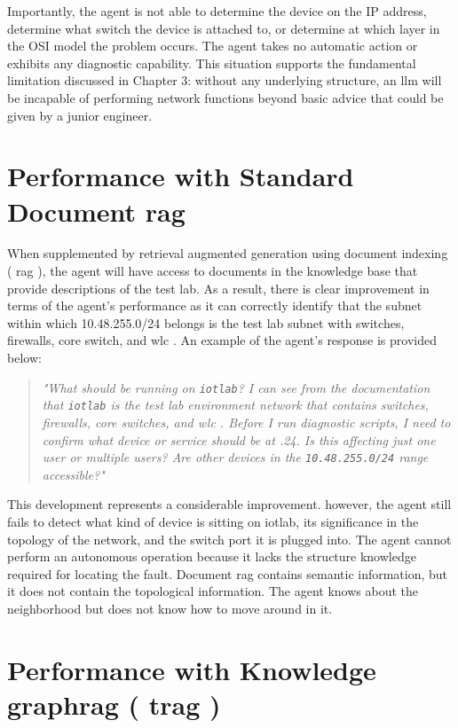 \documentclass[11pt,a4paper]{report}
\begin{document}
Importantly, the agent is not able to determine the device on the IP address, determine what switch the device is attached to, or determine at which layer in the OSI model the problem occurs. The agent takes no automatic action or exhibits any diagnostic capability. This situation supports the fundamental limitation discussed in Chapter 3: without any underlying structure, an \gls{llm}  will be incapable of performing network functions beyond basic advice that could be given by a junior engineer.

\section{Performance with Standard Document  \gls{rag} }
When supplemented by retrieval augmented generation using document indexing ( \gls{rag} ), the agent will have access to documents in the knowledge base that provide descriptions of the test lab. As a result, there is clear improvement in terms of the agent’s performance as it can correctly identify that the subnet within which 10.48.255.0/24 belongs is the test lab subnet with switches, firewalls, core switch, and  \gls{wlc} . An example of the agent’s response is provided below:

\begin{quote}
\textit{"What should be running on \texttt{iotlab}? I can see from the documentation that \texttt{iotlab} is the test lab environment network that contains switches, firewalls, core switches, and  \gls{wlc} . Before I run diagnostic scripts, I need to confirm what device or service should be at .24. Is this affecting just one user or multiple users? Are other devices in the \texttt{10.48.255.0/24} range accessible?"}
\end{quote}

This development represents a considerable improvement. however, the agent still fails to detect what kind of device is sitting on iotlab, its significance in the topology of the network, and the switch port it is plugged into. The agent cannot perform an autonomous operation because it lacks the structure knowledge required for locating the fault. Document  \gls{rag}  contains semantic information, but it does not contain the topological information. The agent knows about the neighborhood but does not know how to move around in it.



\section{Performance with Knowledge \gls{graphrag} ( \gls{trag} )}
\end{document}

